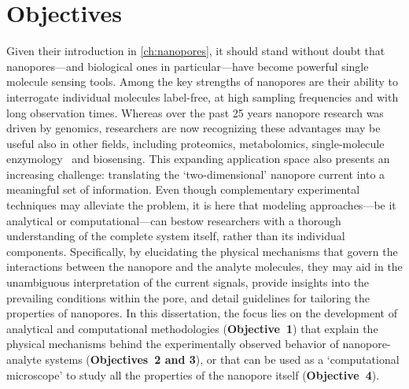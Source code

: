 \chapter{Objectives}
%
\label{ch:objectives}
%



Given their introduction in \cref{ch:nanopores}, it should stand without doubt that nanopores---and biological
ones in particular---have become powerful single molecule sensing tools. Among the key strengths of nanopores
are their ability to interrogate individual molecules label-free, at high sampling frequencies and with long
observation times. Whereas over the past 25 years nanopore research was driven by genomics, researchers are
now recognizing these advantages may be useful also in other fields, including proteomics, metabolomics,
single-molecule enzymology~\cite{Willems-VanMeervelt-2017} and biosensing. This expanding application space
also presents an increasing challenge: translating the `two-dimensional' nanopore current into a meaningful
set of information. Even though complementary experimental techniques may alleviate the problem, it is here
that modeling approaches---be it analytical or computational---can bestow researchers with a thorough
understanding of the complete system itself, rather than its individual components. Specifically, by
elucidating the physical mechanisms that govern the interactions between the nanopore and the analyte
molecules, they may aid in the unambiguous interpretation of the current signals, provide insights into the
prevailing conditions within the pore, and detail guidelines for tailoring the properties of nanopores. In
this dissertation, the focus lies on the development of analytical and computational methodologies
(\textbf{Objective~1}) that explain the physical mechanisms behind the experimentally observed behavior of
nanopore-analyte systems (\textbf{Objectives~2 and 3}), or that can be used as a `computational microscope' to
study all the properties of the nanopore itself (\textbf{Objective~4}).

\clearpage
%
%

